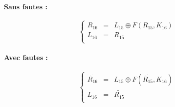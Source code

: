 \documentclass[12pt]{article}
\begin{document}
                   
                    
                    \paragraph{Sans fautes :}
                    \[\left\{
                      \begin{array}{rcr}
                        R_{16}&=&L_{15}\oplus F(R_{15},K_{16}) \\
                        L_{16}&=&R_{15} \\
                      \end{array}
                    \right.\]
                    \paragraph{Avec fautes :}
                     \[\left\{
                      \begin{array}{rcr}
                        \tilde{R_{16}}&=&L_{15}\oplus F(\tilde{R_{15}},K_{16}) \\
                        L_{16}&=&\tilde{R_{15}} \\
                      \end{array}
                    \right.\]
                    
\end{document}
